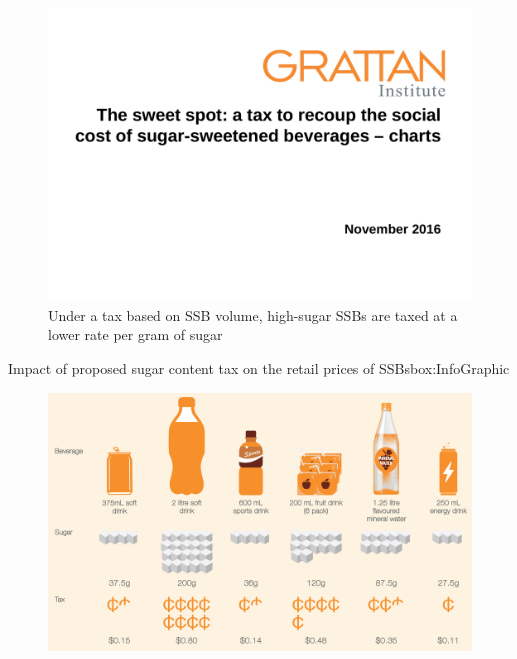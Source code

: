 \documentclass[embargoed]{grattan}
\begin{document}
\begin{figure}
\caption{Under a tax based on SSB volume, high-sugar SSBs are taxed at a lower rate per gram of sugar}\label{fig:under-tax-based-on-SSB-volume-high-sugar-SSBs-taxed-lower}

\includegraphics[page=12]{atlas/ObesityCharts}


\end{figure}

\begin{bigbox*}{Impact of proposed sugar content tax on the retail prices of SSBs}{box:InfoGraphic}
\begin{figure}[H]

\hspace{2.5cm}\includegraphics[width=.8\textwidth]{atlas/InfoGraphicjpg}

\end{figure}
\end{bigbox*}
\end{document}
